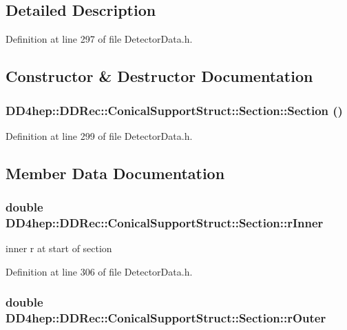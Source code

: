 \subsection{Detailed Description}


Definition at line 297 of file DetectorData.h.

\subsection{Constructor \& Destructor Documentation}
\hypertarget{struct_d_d4hep_1_1_d_d_rec_1_1_conical_support_struct_1_1_section_a01a1dcdce026423d946fae269b6a99de}{
\subsubsection[{Section}]{\setlength{\rightskip}{0pt plus 5cm}DD4hep::DDRec::ConicalSupportStruct::Section::Section ()}}
\label{struct_d_d4hep_1_1_d_d_rec_1_1_conical_support_struct_1_1_section_a01a1dcdce026423d946fae269b6a99de}


Definition at line 299 of file DetectorData.h.

\subsection{Member Data Documentation}
\hypertarget{struct_d_d4hep_1_1_d_d_rec_1_1_conical_support_struct_1_1_section_a9affb6ab8e0306b5c87a794adede9c32}{
\subsubsection[{rInner}]{\setlength{\rightskip}{0pt plus 5cm}double {\bf DD4hep::DDRec::ConicalSupportStruct::Section::rInner}}}
\label{struct_d_d4hep_1_1_d_d_rec_1_1_conical_support_struct_1_1_section_a9affb6ab8e0306b5c87a794adede9c32}


inner r at start of section 

Definition at line 306 of file DetectorData.h.\hypertarget{struct_d_d4hep_1_1_d_d_rec_1_1_conical_support_struct_1_1_section_a2bf73928a0b64cdbc0b58f724c90126a}{
\subsubsection[{rOuter}]{\setlength{\rightskip}{0pt plus 5cm}double {\bf DD4hep::DDRec::ConicalSupportStruct::Section::rOuter}}}
\label{struct_d_d4hep_1_1_d_d_rec_1_1_conical_support_struct_1_1_section_a2bf73928a0b64cdbc0b58f724c90126a}


